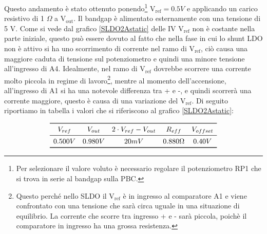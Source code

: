 Questo andamento è stato ottenuto ponendo\footnote{Per selezionare il valore voluto è necessario regolare il potenziometro RP1 che si trova in serie al bandgap sulla PBC.} $\mathrm{V_{ref} = 0.5} V$ e applicando un carico resistivo di 1 $\Omega$ a $\mathrm{V_{out}}$. Il bandgap è alimentato esternamente con una tensione di 5 V. 
Come si vede dal grafico \ref{SLDO2Astatic} delle IV $\mathrm{V_{ref}}$ non è costante nella parte iniziale, questo può essere dovuto al fatto che nella fase in cui lo shunt LDO non è attivo si ha uno scorrimento di corrente nel ramo di $\mathrm{V_{ref}}$, ciò causa una maggiore caduta di tensione sul potenziometro e quindi una minore tensione all'ingresso di A4. 
Idealmente, nel ramo di $\mathrm{V_{ref}}$ dovrebbe scorrere una corrente molto piccola in regime di lavoro\footnote{Questo perché nello SLDO il $\mathrm{V_{ref}}$ è in ingresso al comparatore A1 e viene confrontato con una tensione che sarà circa uguale in una situazione di equilibrio. La corrente che scorre tra ingresso + e - sarà piccola, poichè il comparatore in ingresso ha una grossa resistenza.}, mentre al momento dell'accensione, all'ingresso di A1 si ha una notevole differenza tra + e -, e quindi scorrerà una corrente maggiore, questo è causa di una variazione del $\mathrm{V_{ref}}$. Di seguito riportiamo in tabella i valori che si riferiscono al grafico \ref{SLDO2Astatic}: 

\[
\begin{array}{ccccc}

\toprule
V_{ref} & V_{out} & 2 \cdot V_{ref}- V_{out} & R_{eff} & V_{offset} \\

\midrule

0.500 V & 0.980 V & 20 mV & 0.880 \Omega & 0.40 V \\

\bottomrule
\end{array}
\]

